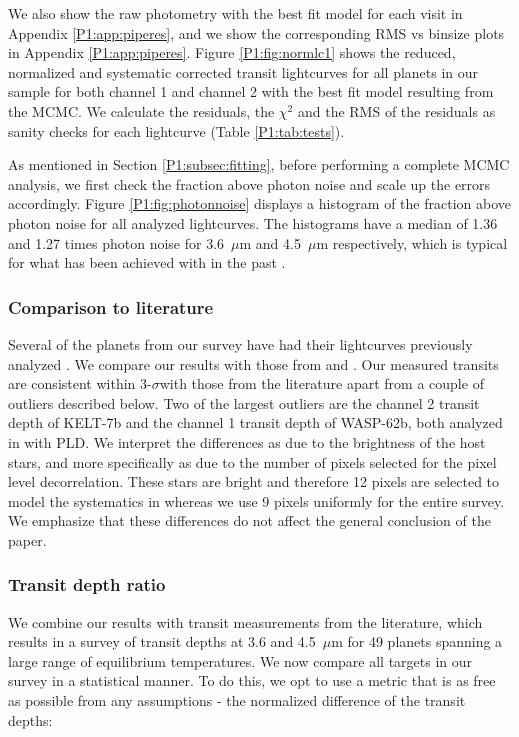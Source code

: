 We also show the raw photometry with the best fit model for each visit in Appendix \ref{P1:app:piperes}, and we show the corresponding RMS vs binsize plots in Appendix \ref{P1:app:piperes}. Figure \ref{P1:fig:normlc1} shows the reduced, normalized and systematic corrected transit lightcurves for all planets in our sample for both channel 1 and channel 2 with the best fit model resulting from the MCMC. We calculate the residuals, the $\chi^2$ and the RMS of the residuals as sanity checks for each lightcurve (Table \ref{P1:tab:tests}).

As mentioned in Section \ref{P1:subsec:fitting}, before performing a complete MCMC analysis, we first check the fraction above photon noise and scale up the errors accordingly. Figure \ref{P1:fig:photonnoise} displays a histogram of the fraction above photon noise for all analyzed lightcurves. The histograms have a median of 1.36 and 1.27 times photon noise for 3.6~$\mu$m and 4.5~$\mu$m respectively, which is typical for what has been achieved with \spitzer in the past \citep{Ingalls2016}.

\subsubsection{Comparison to literature}

Several of the planets from our survey have had their \spitzer lightcurves previously analyzed \citet[e.g.,][]{Sing2016, Garhart2020}. We compare our results with those from \citet{Sing2016} and \citet{Garhart2020}. Our measured transits are consistent within 3-$\sigma$with those from the literature apart from a couple of outliers described below. Two of the largest outliers are the channel 2 transit depth of KELT-7b and the channel 1 transit depth of WASP-62b, both analyzed in \citet{Garhart2020} with PLD. We interpret the differences as due to the brightness of the host stars, and more specifically as due to the number of pixels selected for the pixel level decorrelation. These stars are bright and therefore 12 pixels are selected to model the systematics in \citet{Garhart2020} whereas we use 9 pixels uniformly for the entire survey. We emphasize that these differences do not affect the general conclusion of the paper.

\subsubsection{Transit depth ratio}
\label{P1:subsec:transit}

We combine our results with transit measurements from the literature, which results in a survey of transit depths at 3.6 and 4.5~$\mu$m for 49 planets spanning a large range of equilibrium temperatures. We now compare all targets in our survey in a statistical manner. To do this, we opt to use a metric that is as free as possible from any assumptions - the normalized difference of the transit depths:

